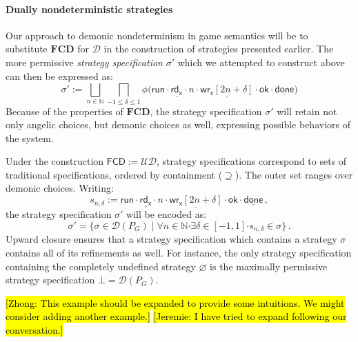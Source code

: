 \documentclass[sigplan,screen]{acmart}
\newcommand{\kw}[1]{\ensuremath{ \mathsf{#1} }}
\newcommand{\bdot}{\boldsymbol{\cdot}}
\newcommand{\hlc}[2][yellow]{ {\sethlcolor{#1} \hl{#2}} }
\newcommand\zhong[1]{\hlc[yellow]{[Zhong: #1]}}
\newcommand\jk[1]{\hlc[pink]{[Jeremie: #1]}}
\begin{document}

\paragraph{Dually nondeterministic strategies} %

Our approach to demonic nondeterminism in game semantics
will be to substitute $\mathbf{FCD}$ for $\mathcal{D}$
in the construction of strategies presented earlier. 
The more permissive \emph{strategy specification} $\sigma'$
which we attempted to construct above
can then be expressed as:
\[
  \sigma' :=
    \bigsqcup_{n \in \mathbb{N}}
    \bigsqcap_{-1 \le \delta \le 1}
    \phi \big(
        \kw{run} \cdot
        \underline{\kw{rd}_\kw{x}} \cdot n \cdot
        \underline{\kw{wr}_\kw{x}[2n + \delta]} \cdot \kw{ok} \cdot
        \underline{\kw{done}} \big)
\]
Because of the properties of $\mathbf{FCD}$,
the strategy specification $\sigma'$ will retain
not only angelic choices,
but demonic choices as well,
expressing possible behaviors
of the system.

Under the construction $\kw{FCD} := \mathcal{U} \mathcal{D}$,
strategy specifications correspond to
sets of traditional specifications,
ordered by containment ($\supseteq$).
The outer set ranges over demonic choices.
Writing:
\[
  s_{n,\delta} :=
        \kw{run} \cdot
        \underline{\kw{rd}_\kw{x}} \cdot n \cdot
        \underline{\kw{wr}_\kw{x}[2n + \delta]} \cdot \kw{ok} \cdot
        \underline{\kw{done}} \,,
\]
the strategy specification $\sigma'$
will be encoded as:
\[
  \sigma' =
  \{ \sigma \in \mathcal{D}(P_G) \mid
     \forall n \in \mathbb{N} \bdot
     \exists \delta \in [-1,1] \bdot
     s_{n,\delta} \in \sigma \} \,.
\]
Upward closure ensures that a strategy specification
which contains a strategy $\sigma$
contains all of its refinements as well.
For instance,
the only strategy specification
containing the completely undefined strategy $\varnothing$
is the maximally permissive strategy specification $\bot = \mathcal{D}(P_G)$.

\zhong{This example should be expanded to provide some intuitions. We might consider adding another example.}
\jk{I have tried to expand following our conversation.}



%
%
\end{document}
